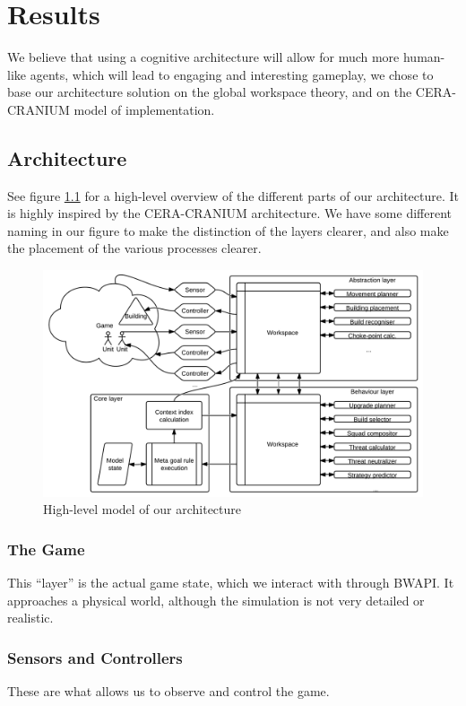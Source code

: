 
\chapter{Results}
We believe that using a cognitive architecture will allow for much
more human-like agents, which will lead to engaging and interesting gameplay, we
chose to base our architecture solution on the global workspace theory, and on the
CERA-CRANIUM\cite{arrabales2009ceracranium} model of implementation.

\section{Architecture}
See figure \ref{fig:our-architecture} for a high-level overview of the
different parts of our architecture. It is highly inspired by the CERA-CRANIUM
architecture. We have some different naming in our figure to make the
distinction of the layers clearer, and also make the placement of the various
processes clearer.

\begin{figure}[h!tb]
\centering
\includegraphics[scale=1.0]{graphics/our-architecture.png}
\caption{High-level model of our architecture}
\label{fig:our-architecture}
\end{figure}

\subsection{The Game}
This ``layer'' is the actual game state, which we interact with through BWAPI.
It approaches a physical world, although the simulation is not very detailed or
realistic.

\subsection{Sensors and Controllers}
These are what allows us to observe and control the game.

